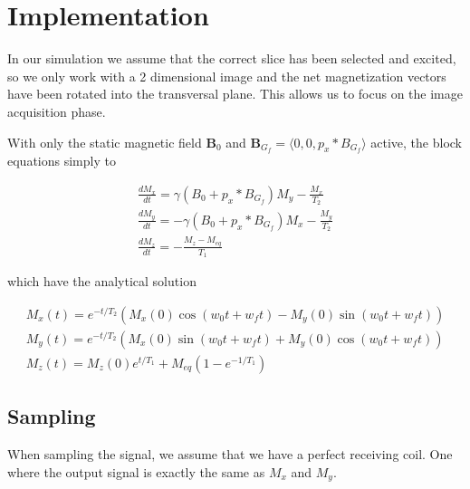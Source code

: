 \section{Implementation}



In our simulation we assume that the correct slice has been selected
and excited, so we only work with a 2 dimensional image and the net
magnetization vectors have been rotated into the transversal
plane. This allows us to focus on the image acquisition phase.


With only the static magnetic field $\mathbf{B}_0$ and
$\mathbf{B}_{G_f} = \langle 0, 0, p_x * B_{G_f} \rangle$ active, the
block equations simply to

\begin{displaymath}
  \begin{array}{l}
    \frac{dM_x}{dt} = \gamma (B_0 + p_x * B_{G_f}) M_y - \frac{M_x}{T_2} \\
    \frac{dM_y}{dt} = - \gamma (B_0 + p_x * B_{G_f}) M_x - \frac{M_y}{T_2} \\
    \frac{dM_z}{dt} = - \frac{M_z - M_{eq}}{T_1}
  \end{array}
\end{displaymath}

which have the analytical solution 

\begin{displaymath}
  \begin{array}{l}
    M_x(t) = e^{-t/T_2}(M_x(0) \cos(w_0 t + w_f t) - M_y(0) \sin (w_0 t + w_f t)) \\
    M_y(t) = e^{-t/T_2}(M_x(0) \sin(w_0 t + w_f t) + M_y(0) \cos (w_0 t + w_f t)) \\
    M_z(t) = M_z(0) e^{t/T_1} + M_{eq}(1 - e^{-1/T_1})
  \end{array}
\end{displaymath}



\subsection{Sampling}

When sampling the signal, we assume that we have a perfect receiving
coil. One where the output signal is exactly the same as $M_x$ and
$M_y$.



